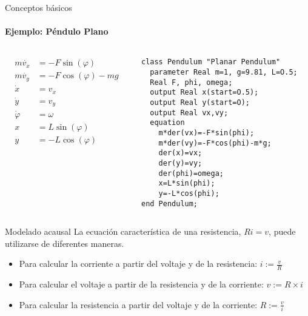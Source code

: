 \begin{frame}[fragile]{Conceptos básicos}
   \framesubtitle{Ejemplo: Péndulo Plano}
   \fontsize{8pt}{7.2}\selectfont
    \begin{columns}
        \begin{column}{0.4\textwidth}
                \begin{align*}
                    m\dot{v_{x}}  & =-F\sin(\varphi)\nonumber \\
                    m\dot{v_{y}}  & =-F\cos(\varphi)-mg\nonumber \\
                    \dot{x}       & =v_{x}\nonumber \\
                    \dot{y}       & =v_{y}\\
                    \dot{\varphi} & =\omega\nonumber \\
                    x             & =L\sin(\varphi)\nonumber \\
                    y             & =-L\cos\left(\varphi\right)\nonumber
                \end{align*}
        \end{column}
        \begin{column}{0.6\textwidth}
            \begin{lstlisting}[language=Modelica]
class Pendulum "Planar Pendulum"
  parameter Real m=1, g=9.81, L=O.5;
  Real F, phi, omega;
  output Real x(start=O.5);
  output Real y(start=O);
  output Real vx,vy;
  equation
    m*der(vx)=-F*sin(phi);
    m*der(vy)=-F*cos(phi)-m*g;
    der(x)=vx;
    der(y)=vy;
    der(phi)=omega;
    x=L*sin(phi);
    y=-L*cos(phi);
end Pendulum;
            \end{lstlisting}
        \end{column}
    \end{columns}
\end{frame}

\begin{frame}[fragile]{Modelado acausal}
    La ecuación característica de una resistencia, $Ri=v$, puede utilizarse de diferentes maneras.
    \pause
    \begin{itemize}
        \item<1-> Para calcular la corriente a partir del voltaje y de la resistencia: $i :=\frac{v}{R}$
        \item<2-> Para calcular el voltaje a partir de la resistencia
y de la corriente: $v :=R\times i$
        \item<3-> Para calcular la resistencia a partir del voltaje y
de la corriente: $R :=\frac{v}{i}$
    \end{itemize}
\end{frame}

